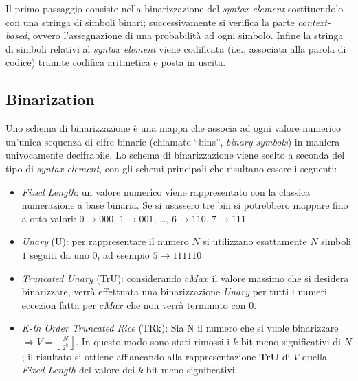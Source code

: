 Il primo passaggio consiste nella binarizzazione del \emph{syntax element} 
sostituendolo con una stringa di simboli binari; successivamente si verifica 
la parte \emph{context-based}, ovvero l'assegnazione di una probabilità ad ogni 
simbolo. Infine la stringa di simboli relativi al \emph{syntax element} viene 
codificata (i.e., associata alla parola di codice) tramite codifica aritmetica e
posta in uscita.

\subsection{Binarization}
Uno schema di binarizzazione è una mappa che associa ad ogni valore numerico 
un'unica sequenza di cifre binarie (chiamate ``bins'', \emph{binary symbols}) 
in maniera univocamente decifrabile. Lo schema di binarizzazione viene scelto a
seconda del tipo di \emph{syntax element}, con gli schemi principali che 
risultano essere i seguenti:
\begin{itemize}
\item \emph{Fixed Length}: un valore numerico viene rappresentato con la 
  classica numerazione a base binaria. Se si usassero tre bin si potrebbero 
  mappare fino a otto valori: $0 \rightarrow 000$, $1 \rightarrow 001$, 
  {\ldots}, $6 \rightarrow 110$, $7 \rightarrow 111$

\item \emph{Unary} (U): per rappresentare il numero $N$ si utilizzano 
  esattamente $N$ simboli $1$ seguiti da uno $0$, ad esempio $5 \rightarrow 
  111110$

\item \emph{Truncated Unary} (TrU): considerando $cMax$ il valore massimo che 
  si desidera binarizzare, verrà effettuata una binarizzazione \emph{Unary} 
  per tutti i numeri eccezion fatta per $cMax$ che non verrà terminato con $0$.

\item \emph{K-th Order Truncated Rice} (TRk): Sia N il numero che si vuole 
  binarizzare $\Rightarrow V = \left\lfloor\frac{N}{2^k}\right\rfloor$. In 
  questo modo sono stati rimossi i $k$ bit meno significativi di $N$; il 
  risultato si ottiene affiancando alla rappresentazione \textbf{TrU} di $V$ 
  quella \emph{Fixed Length} del valore dei $k$ bit meno significativi.

\end{itemize}

